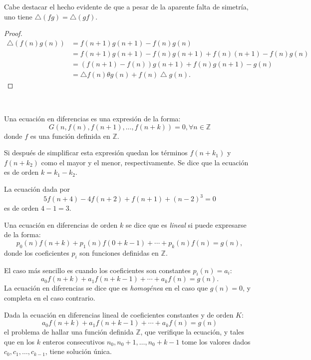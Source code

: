 \begin{remark}
	Cabe destacar el hecho evidente de que a pesar de la aparente falta de simetría, uno tiene $\bigtriangleup\left(fg\right)=\bigtriangleup\left(gf\right)$.
\end{remark}

\begin{proof}
	\begin{align*}
		\bigtriangleup\left(f(n)g(n)\right)
		&=f\left(n+1\right)g\left(n+1\right)-f(n)g(n)\\
		&=f(n+1)g(n+1)-f(n)g(n+1)+f(n)(n+1)-f(n)g(n)\\
		&=(f(n+1)-f(n))g(n+1)+f(n)g(n+1)-g(n)\\
		&=\bigtriangleup f(n)\theta g(n)+f(n)\bigtriangleup g(n).
	\end{align*}
\end{proof}

\

Una ecuación en diferencias es una expresión de la forma: \[ G\left(n,f(n),f(n+1),\ldots,f(n+k)\right)=0,\forall n\in\mathds{Z} \] donde $f$ es una función definida en $\mathds{Z}$.

Si después de simplificar esta expresión quedan los términos $f\left(n+k_{1}\right)$ y $f\left(n+k_{2}\right)$ como el mayor y el menor, respectivamente. Se dice que la ecuación es de orden $k=k_{1}-k_{2}$.
\begin{example}
	La ecuación dada por \[ 5f(n+4)-4f(n+2)+f(n+1)+(n-2)^{3}=0 \] es de orden $4-1=3$.
\end{example}
Una ecuación en diferencias de orden $k$ se dice que es \emph{lineal} si puede expresarse de la forma: \[ p_{0}(n)f(n+k)+p_{1}(n)f(0+k-1)+\cdots+p_{k}(n)f(n)=g(n), \] donde los coeficientes $p_{i}$ son funciones definidas en $\mathds{Z}$.

El caso más sencillo es cuando los coeficientes son constantes $p_{i}(n)=a_{i}$: \[ a_{0}f(n+k)+a_{1}f(n+k-1)+\cdots+a_{k}f(n)=g(n). \] La ecuación en diferencias se dice que es \emph{homogénea} en el caso que $g(n)=0$, y completa en el caso contrario.

\begin{theorem}{}
	Dada la ecuación en diferencias lineal de coeficientes constantes y de orden $ K $: \[ a_{0}f(n+k)+a_{1}f(n+k-1)+\cdots+a_{k}f(n)=g(n) \] el problema de hallar una función definida $\mathds{Z}$, que verifique la ecuación, y tales que en los $k$ enteros consecutivos $n_{0},n_{0}+1,\ldots,n_{0}+k-1$ tome los valores dados $c_{0},c_{1},\ldots,c_{k-1}$, tiene solución única.
\end{theorem}

